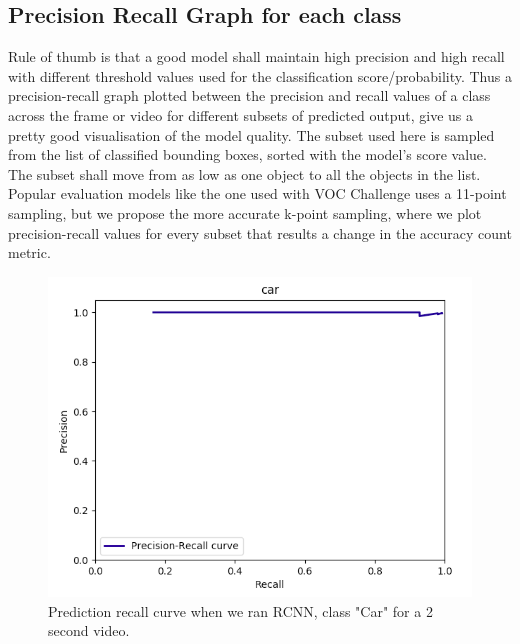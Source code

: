 \documentclass[conference]{IEEEtran}
\newcommand{\figwidthb}{0.80\linewidth}
\begin{document}
\subsection{Precision Recall Graph for each class}
	Rule of thumb is that a good model shall maintain high precision and high recall with different threshold values used for the classification score/probability. Thus a precision-recall graph plotted between the precision and recall values of a class across the frame or video for different subsets of predicted output, give us a pretty good visualisation of the model quality. The subset used here is sampled from the list of classified bounding boxes, sorted with the model's score value. The subset shall move from as low as one object to all the objects in the list. Popular evaluation models like the one used with VOC Challenge uses a 11-point sampling, but we propose the more accurate k-point sampling, where we plot precision-recall values for every subset that results a change in the accuracy count metric.
\begin{figure}
\centering
\includegraphics[width=\figwidthb]{fig/pr_rcnn.png}
\caption{Prediction recall curve when we ran RCNN, class "Car" for a 2 second video.} \label{fig.structure}
\end{figure}
\end{document}
